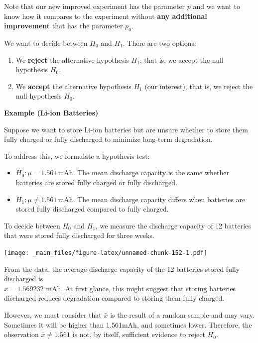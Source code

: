 \documentclass[
]{book}
\providecommand{\tightlist}{%
  \setlength{\itemsep}{0pt}\setlength{\parskip}{0pt}}
\begin{document}
Note that our new improved experiment has the parameter \(p\) and we want to know how it compares to the experiment without \textbf{any additional improvement} that has the parameter \(p_0\).

We want to decide between \(H_0\) and \(H_1\). There are two options:

\begin{enumerate}
\def\labelenumi{\arabic{enumi}.}
\item
  We \textbf{reject} the alternative hypothesis \(H_1\); that is, we accept the null hypothesis \(H_0\).
\item
  We \textbf{accept} the alternative hypothesis \(H_1\) (our interest); that is, we reject the null hypothesis \(H_0\).
\end{enumerate}

\textbf{Example (Li-ion Batteries)}

Suppose we want to store Li-ion batteries but are unsure whether to store them fully charged or fully discharged to minimize long-term degradation.

To address this, we formulate a hypothesis test:

\begin{itemize}
\tightlist
\item
  \(H_0: \mu = 1.561\,\text{mAh}\). The mean discharge capacity is the same whether batteries are stored fully charged or fully discharged.\\
\item
  \(H_1: \mu \neq 1.561\,\text{mAh}\). The mean discharge capacity differs when batteries are stored fully discharged compared to fully charged.
\end{itemize}

To decide between \(H_0\) and \(H_1\), we measure the discharge capacity of 12 batteries that were stored fully discharged for three weeks.

\texttt{[image: \_main\_files/figure-latex/unnamed-chunk-152-1.pdf]}

From the data, the average discharge capacity of the 12 batteries stored fully discharged is\\
\(\bar{x} = 1.569232\) mAh. At first glance, this might suggest that storing batteries discharged reduces degradation compared to storing them fully charged.

However, we must consider that \(\bar{x}\) is the result of a random sample and may vary. Sometimes it will be higher than 1.561mAh, and sometimes lower. Therefore, the observation \(\bar{x} \ne 1.561\) is not, by itself, sufficient evidence to reject \(H_0\).
\end{document}
